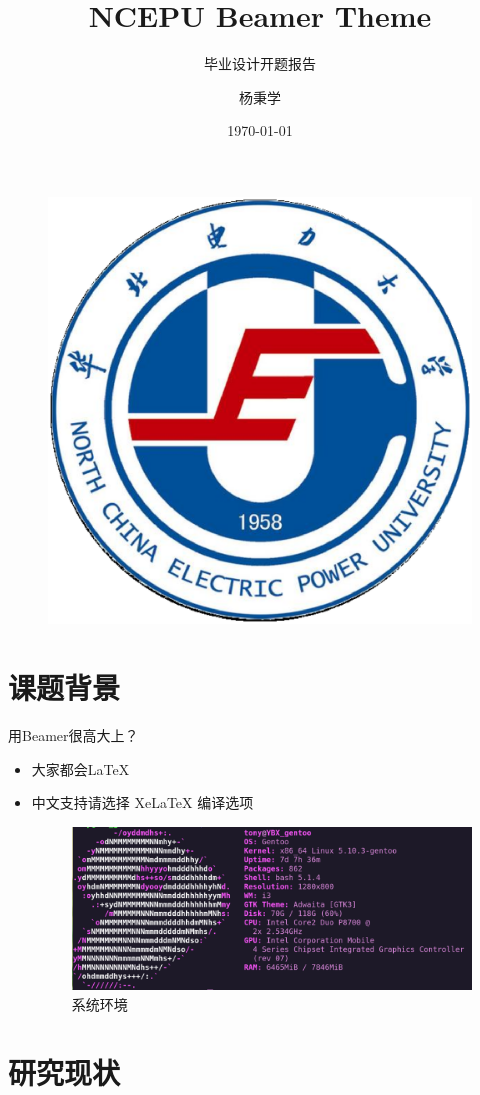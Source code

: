 \documentclass{beamer}
\author{杨秉学}
\title{NCEPU Beamer Theme}
\subtitle{毕业设计开题报告}
\institute{华北电力大学控制与计算机工程学院}
\date{\today}
\begin{document}
\kaishu
\begin{frame}
	\titlepage
	\begin{figure}[htpb]
		\begin{center}
        \includegraphics[width=0.2\linewidth]{pic/Ncepu_University_Logo.eps}
		\end{center}
	\end{figure}
\end{frame}
\begin{frame}
\tableofcontents[sectionstyle=show,subsectionstyle=show/shaded/hide,subsubsectionstyle=show/shaded/hide]
\end{frame}


\section{课题背景}

\begin{frame}{用Beamer很高大上？}
\begin{itemize}
\item 大家都会\LaTeX{}
\item 中文支持请选择 Xe\LaTeX{} 编译选项
    \begin{figure}
        \centering
        \includegraphics[height=0.4\textheight]{pic/gentoo_Logo.eps}
        \caption{系统环境}
    \end{figure}
\end{itemize}
\end{frame}

\section{研究现状}
\end{document}

